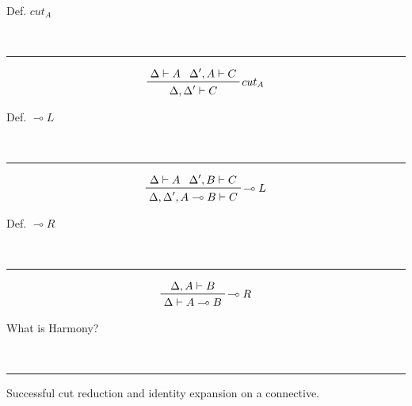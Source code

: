 \begin{note}
  \begin{field}
    Def. $cut_A$
  \end{field} \\
  \noindent\rule[0.5ex]{\linewidth}{1pt}
  \begin{field}
    \[ 
      \prftree[r]
      {$cut_A$}
      {\Delta\vdash A}
      {\Delta',A\vdash C}
      {\Delta,\Delta'\vdash C}
    \] 
  \end{field}
\end{note}

\begin{note}
  \begin{field}
    Def. $\multimap L$
  \end{field} \\
  \noindent\rule[0.5ex]{\linewidth}{1pt}
  \begin{field}
    \[
      \prftree[r]
      {$\multimap L$}
      {\Delta\vdash A}
      {\Delta', B\vdash C}
      {\Delta, \Delta', A\multimap B\vdash C}
    \]
  \end{field}
\end{note}

\begin{note}
  \begin{field}
    Def. $\multimap R$
  \end{field} \\
  \noindent\rule[0.5ex]{\linewidth}{1pt}
  \begin{field}
    \[ 
      \prftree[r]
      {$\multimap R$}
      {\Delta, A\vdash B}
      {\Delta\vdash A\multimap B}
    \] 
  \end{field}
\end{note}


\begin{note}
  \begin{field}
    What is Harmony?
  \end{field} \\
  \noindent\rule[0.5ex]{\linewidth}{1pt}
  \begin{field}
    Successful cut reduction and identity expansion on a connective.
  \end{field}
\end{note}

